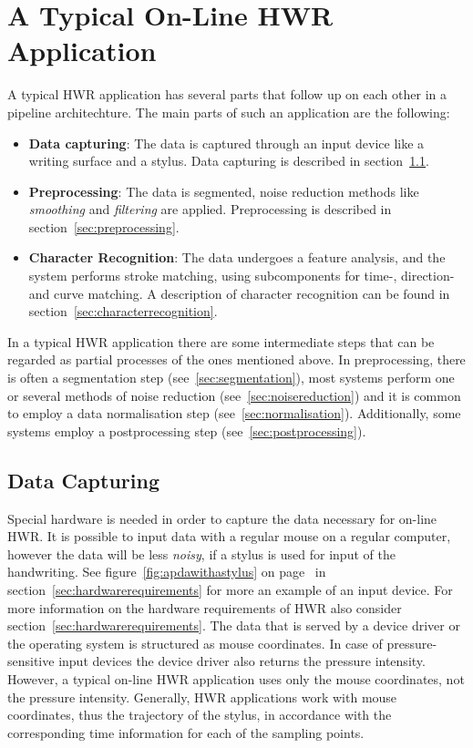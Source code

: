\section{A Typical On-Line HWR Application}
\label{sec:atypicalonlinehwrapplication}

A typical HWR application has several parts that follow up on each other in a
pipeline architechture. The main parts of such an application are the following:
\begin{itemize}
\item \textbf{Data capturing}: The data is captured through an input device 
  like a writing surface and a stylus. Data capturing is described in
  section~\ref{sec:datacapturing}.
\item \textbf{Preprocessing}: The data is segmented, noise reduction 
  methods like 
  \emph{smoothing} and \emph{filtering} are applied. 
  Preprocessing is described in section~\ref{sec:preprocessing}.
\item \textbf{Character Recognition}: The data undergoes a feature analysis, 
  and the system performs stroke matching, using subcomponents for
  time-, direction- and curve matching. 
  A description of character recognition can be 
  found in section~\ref{sec:characterrecognition}.
\end{itemize}
In a typical HWR application there are some intermediate steps that can be 
regarded as partial processes of the ones mentioned above. In preprocessing,
there is often a segmentation step (see~\ref{sec:segmentation}), most systems 
perform one or several methods of noise reduction (see~\ref{sec:noisereduction}) and it is common to employ a data normalisation step 
(see~\ref{sec:normalisation}). Additionally, some systems employ a 
postprocessing step (see~\ref{sec:postprocessing}). 

\subsection{Data Capturing}
\label{sec:datacapturing}

Special hardware is needed in order to capture the data necessary 
for on-line HWR. It is possible to input data with a regular mouse on 
a regular computer, however the data will be less \emph{noisy}, 
if a stylus is used for input of the handwriting. 
See figure~\ref{fig:apdawithastylus} on page~\pageref{fig:apdawithastylus} 
in section~\ref{sec:hardwarerequirements} for more an example of an input device.
For more information on the hardware requirements of HWR also consider 
section~\ref{sec:hardwarerequirements}. The data that is served by a device 
driver or the operating system is structured as mouse coordinates. 
In case of pressure-sensitive input devices the device driver also returns 
the pressure intensity. 
However, a typical on-line HWR application uses only the mouse coordinates,
not the pressure intensity. Generally, HWR applications work with mouse
coordinates, thus the trajectory of the stylus, in accordance with the 
corresponding time information for each of the sampling points. 

